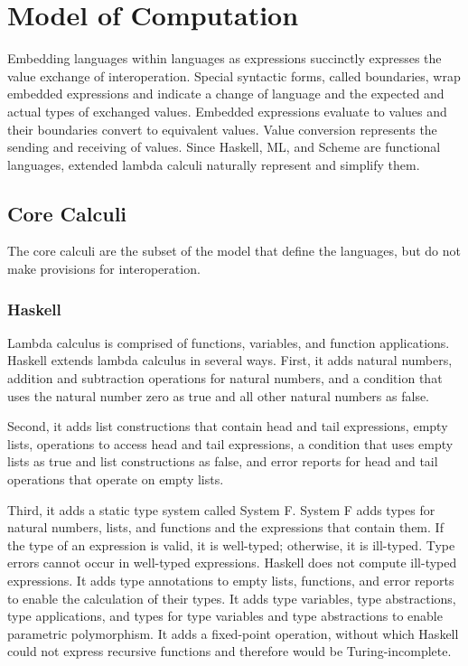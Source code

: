 \chapter{Model of Computation}

Embedding languages within languages as expressions succinctly expresses the value exchange of interoperation.  Special syntactic forms, called boundaries, wrap embedded expressions and indicate a change of language and the expected and actual types of exchanged values.  Embedded expressions evaluate to values and their boundaries convert to equivalent values.  Value conversion represents the sending and receiving of values.  Since Haskell, ML, and Scheme are functional languages, extended lambda calculi naturally represent and simplify them.

\section{Core Calculi}

The core calculi are the subset of the model that define the languages, but do not make provisions for interoperation.

\subsection{Haskell}

Lambda calculus is comprised of functions, variables, and function applications.  Haskell extends lambda calculus in several ways.  First, it adds natural numbers, addition and subtraction operations for natural numbers, and a condition that uses the natural number zero as true and all other natural numbers as false.

Second, it adds list constructions that contain head and tail expressions, empty lists, operations to access head and tail expressions, a condition that uses empty lists as true and list constructions as false, and error reports for head and tail operations that operate on empty lists.

Third, it adds a static type system called System F.  System F adds types for natural numbers, lists, and functions and the expressions that contain them.  If the type of an expression is valid, it is well-typed; otherwise, it is ill-typed.  Type errors cannot occur in well-typed expressions.  Haskell does not compute ill-typed expressions.  It adds type annotations to empty lists, functions, and error reports to enable the calculation of their types.  It adds type variables, type abstractions, type applications, and types for type variables and type abstractions to enable parametric polymorphism.  It adds a fixed-point operation, without which Haskell could not express recursive functions and therefore would be Turing-incomplete.

